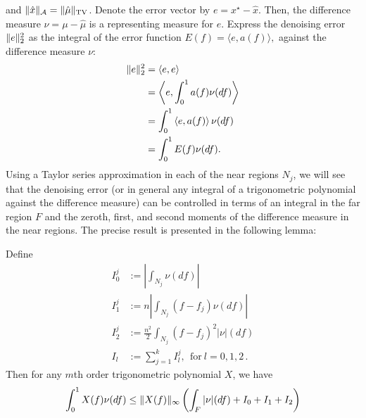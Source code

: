 and $\lVert\hat{x}\rVert_{\mathcal{A}} = \lVert\hat{\mu}\rVert_{\mathrm{TV}}$. Denote the error
vector by $e = x^\star - \hat{x}$. Then, the difference measure $\nu = \mu -
\hat{\mu}$ is a representing measure for $e$. Express the denoising
error $\lVert e\rVert_2^2$ as the integral of the error function $E(f) = \langle e,
a(f) \rangle,$ against the difference measure $\nu$:
\begin{align*}
\lVert e\rVert_2^2 &= \langle e, e \rangle\\
& = \left\langle e, \int_0^1 a(f) \nu(df) \right\rangle\\
& =  \int_0^1  \left\langle e,a(f) \right\rangle \nu(df)\\
& = \int_0^1 E(f) \nu(df).
\end{align*}
Using a Taylor series approximation in each of the near regions $N_j$, we will see that the denoising error (or in general any integral of a trigonometric
polynomial against the difference measure) can be controlled in terms of an
integral in the far region $F$ and the zeroth, first, and second moments of the
difference measure in the near regions. The precise result is presented in the
following lemma:
\begin{lemma}
\label{part1}
Define
\begin{align*} 
I_0^j &:= \left| \int_{N_j} \nu(df) \right|\\
I_1^j &:= n \left| \int_{N_j} (f-f_j) \nu(df) \right|\\
I_2^j &:= \frac{n^2}{2} \int_{N_j} (f-f_j)^2 |\nu|(df)\\
I_l &:= \sum_{j=1}^k I_l^j,~~\mbox{for}~l = 0, 1, 2\,.
\end{align*}
Then for any $m$th order trigonometric polynomial $X$, we have
\[
\int_0^1{ X(f) \nu(df)}
\leq \lVert X(f)\rVert_\infty \left(\int_F{|\nu|(df)} + I_0 + I_1 + I_2\right)
\]
\end{lemma}
